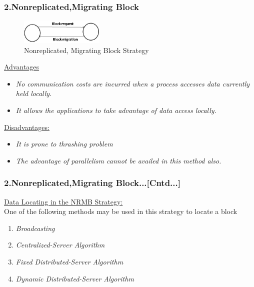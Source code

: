 \documentclass{beamer}
\begin{document}
\begin{frame}
	\frametitle{2.Nonreplicated,Migrating Block}
	\begin{figure}
		\centering
		\includegraphics[width=4cm]{fig54.jpg}
		\caption{Nonreplicated, Migrating Block Strategy}
		\label{fig54}
	\end{figure}
	\underline{Advantages}
	\vspace{0.25cm}
	\begin{itemize}
		\item \textit{No communication costs are incurred when a process accesses data currently held locally.}
		\item \textit{It allows the applications to take advantage of data access locally.}
	\end{itemize}
	\underline{Disadvantages:}
	\vspace{0.25cm}
	\begin{itemize}
		\item \textit{It is prone to thrashing problem}
		\item \textit{The advantage of parallelism cannot be availed in this method also.}
	\end{itemize}
\end{frame}


\begin{frame}
	\frametitle{2.Nonreplicated,Migrating Block...[Cntd...]}
	\underline{Data Locating in the NRMB Strategy:}\\
	\vspace{0.25cm}
	One of the following methods may be used in this strategy to locate a block
	\vspace{0.25cm}
	\begin{enumerate}
		\item \textit{Broadcasting}
		\item \textit{Centralized-Server Algorithm}
		\item \textit{Fixed Distributed-Server Algorithm}
		\item \textit{Dynamic Distributed-Server Algorithm}
	\end{enumerate}
	\vspace{2cm}
\end{frame}
\end{document}
